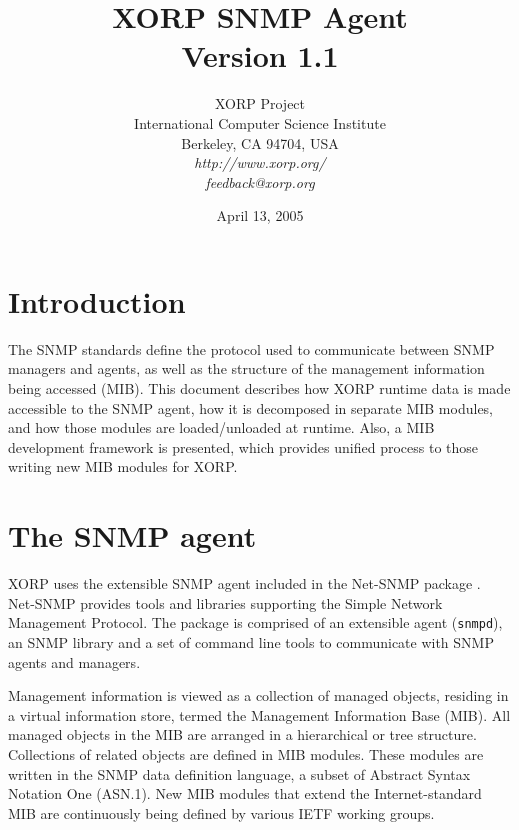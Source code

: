 \documentclass[11pt]{article}
\begin{document}
\title{XORP SNMP Agent \\
\vspace{1ex}
Version 1.1}
\author{ XORP Project					\\
	 International Computer Science Institute	\\
	 Berkeley, CA 94704, USA			\\
         {\it http://www.xorp.org/}			\\
	 {\it feedback@xorp.org}
}
\date{April 13, 2005}

\maketitle

\thispagestyle{empty}


\section{Introduction}


The SNMP standards \cite{STD0062} define the protocol used to communicate
between SNMP managers and agents, as well as the structure of the management
information being accessed (MIB).  This document describes how XORP runtime data
is made accessible to the SNMP agent, how it is decomposed in separate MIB
modules, and how those modules are loaded/unloaded at runtime.  Also, a MIB
development framework is presented, which provides unified process to those
writing new MIB modules for XORP.

\section{The SNMP agent}

XORP uses the extensible SNMP agent included in the Net-SNMP package
\cite{net-snmp}.  Net-SNMP provides tools and libraries supporting the Simple
Network Management Protocol.  The package is comprised of an extensible agent
(\texttt{snmpd}), an SNMP library and a set of command line tools to
communicate with SNMP agents and managers. 

Management information is viewed as a collection of managed objects, residing
in a virtual information store, termed the Management Information Base (MIB).
All managed objects in the MIB are arranged in a hierarchical or tree
structure.  Collections of related objects are defined in MIB modules.  These
modules are written in the SNMP data definition language, a subset of Abstract
Syntax Notation One (ASN.1).  New MIB modules that extend the Internet-standard
MIB are continuously being defined by various IETF working groups.  
\end{document}
